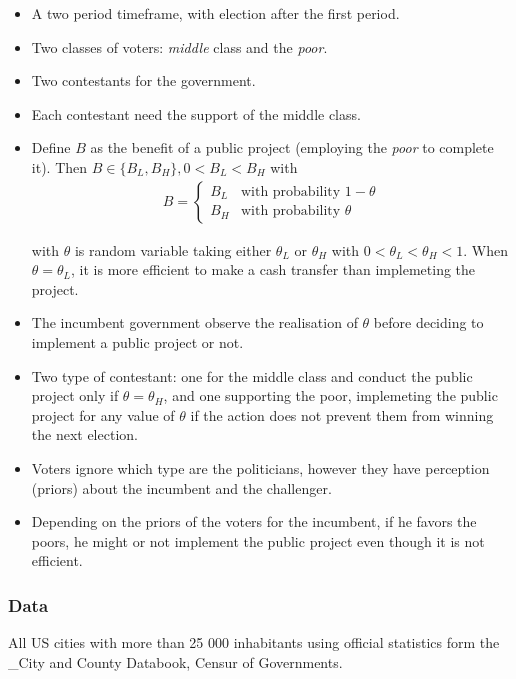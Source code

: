\begin{itemize}
\item
  A two period timeframe, with election after the first period.
\item
  Two classes of voters: \emph{middle} class and the \emph{poor}.
\item
  Two contestants for the government.
\item
  Each contestant need the support of the middle class.
\item
  Define \(B\) as the benefit of a public project (employing the
  \emph{poor} to complete it). Then
  \(B \in \{B_L, B_H\}, 0 < B_L < B_H\) with\\

  \begin{align*}
  B = 
  \left\{
    \begin{array}{ll}
    B_L & \mbox{with probability } 1-\theta \\
    B_H & \mbox{with probability } \theta
    \end{array}
  \right.
  \end{align*}

  with \(\theta\) is random variable taking either \(\theta_L\) or
  \(\theta_H\) with \(0 < \theta_L < \theta_H < 1\). When
  \(\theta=\theta_L\), it is more efficient to make a cash transfer than
  implemeting the project.
\item
  The incumbent government observe the realisation of \(\theta\) before
  deciding to implement a public project or not.
\item
  Two type of contestant: one for the middle class and conduct the
  public project only if \(\theta = \theta_H\), and one supporting the
  poor, implemeting the public project for any value of \(\theta\) if
  the action does not prevent them from winning the next election.
\item
  Voters ignore which type are the politicians, however they have
  perception (priors) about the incumbent and the challenger.
\item
  Depending on the priors of the voters for the incumbent, if he favors
  the poors, he might or not implement the public project even though it
  is not efficient.
\end{itemize}

\subsubsection{Data}\label{data}

All US cities with more than 25 000 inhabitants using official
statistics form the \_City and County Databook, Censur of Governments.

